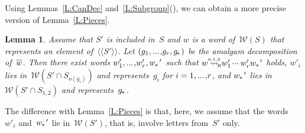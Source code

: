 \documentclass{amsart}
\numberwithin{equation}{section}
\theoremstyle{plain}
\newtheorem{lemm}[prop]{Lemma}
\theoremstyle{definition}
\newcounter{ITEM}
\begin{document}
Using Lemmas~\ref{L:CanDec} and~\ref{L:Subgroup}{\setcounter{ITEM}{2}\leavevmode\hbox{\rm()}}, we can obtain a more precise version of Lemma~\ref{L:Pieces}.

\begin{lemm}
\label{L:PiecesBis} 
Assume that ${S}'$ is included in~${S}$ and ${w}$ is a word of~${\mathcal{W}({S})}$ that represents an element of~${\langle\!\langle{{{S}'}}\rangle\!\rangle}$. Let $({g}_1 {, ...\hspace{0.2ex},} {g}_{r}, {{g}_{\hspace{-0.2ex}*\hspace{0.2ex}}})$ be the amalgam decomposition of~${\overline{\vrule width0pt height5pt{w}}}$. Then there exist words ${w}'_1 {, ...\hspace{0.2ex},} {w}'_{r}, {{w}_{\hspace{-0.1ex}*\hspace{0.2ex}}}'$ such that ${w} {\mathrel{{\mathrel{\overset{\scriptscriptstyle 0,1,2}{\rightsquigarrow}}}_{\hspace{-0.9ex}{\scriptscriptstyle R}}}} {w}'_1 {\hspace{0.2ex}{\cdot}{\cdot}{\cdot}\hspace{0.5ex}} {w}'_{r} {{w}_{\hspace{-0.1ex}*\hspace{0.2ex}}}'$ holds, ${w}'_{i}$ lies in~${\mathcal{W}({{S}' \cap {S}_{{o({{g}_{i}})}}})}$ and represents~${g}_{i}$ for ${i} = 1 {, ...\hspace{0.2ex},} {r}$, and ${{w}_{\hspace{-0.1ex}*\hspace{0.2ex}}}'$ lies in~${\mathcal{W}({{S}' \cap {S}_{1,2}})}$ and represents~${{g}_{\hspace{-0.2ex}*\hspace{0.2ex}}}$.
\end{lemm}

The difference with Lemma~\ref{L:Pieces} is that, here, we assume that the words~${w}'_{i}$ and~${{w}_{\hspace{-0.1ex}*\hspace{0.2ex}}}'$ lie in~${\mathcal{W}({{S}'})}$, that is, involve letters from~${S}'$ only.
\end{document}
